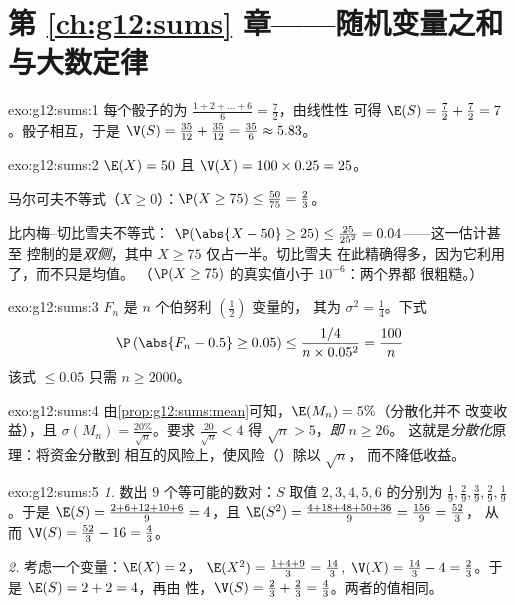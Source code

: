 \section*{第 \ref{ch:g12:sums} 章——随机变量之和与大数定律}

\begin{solution}{exo:g12:sums:1}
每个骰子的为
$\frac{1 + 2 + \dots + 6}{6} = \frac{7}{2}$，由线性性
可得 $\E(S) = \frac72 + \frac72 = 7$。骰子相互，于是
$\V(S) = \frac{35}{12} + \frac{35}{12} = \frac{35}{6} \approx 5.83$。
\end{solution}

\begin{solution}{exo:g12:sums:2}
$\E(X) = 50$ 且 $\V(X) = 100 \times 0.25 = 25$。

马尔可夫不等式（$X \geq 0$）：$\P(X \geq 75) \leq \frac{50}{75} = \frac23$。

比内梅--切比雪夫不等式：
$\P(\abs{X - 50} \geq 25) \leq \frac{25}{25^2} = 0.04$——这一估计甚至
控制的是\emph{双侧}，其中 $X \geq 75$ 仅占一半。切比雪夫
在此精确得多，因为它利用了，而不只是均值。
（$\P(X \geq 75)$ 的真实值小于 $10^{-6}$：两个界都
很粗糙。）
\end{solution}

\begin{solution}{exo:g12:sums:3}
$F_n$ 是 $n$ 个伯努利 $\left(\frac12\right)$ 变量的，
其为 $\sigma^2 = \frac14$。下式
\[
\P\left(\abs{F_n - 0.5} \geq 0.05\right)
\leq \frac{1/4}{n \times 0.05^2} = \frac{100}{n}
\]
该式 $\leq 0.05$ 只需 $n \geq 2000$。
\end{solution}

\begin{solution}{exo:g12:sums:4}
由\cref{prop:g12:sums:mean}可知，$\E(M_n) = 5\%$（分散化并不
改变收益），且
$\sigma(M_n) = \frac{20\%}{\sqrt n}$。要求
$\frac{20}{\sqrt n} < 4$ 得 $\sqrt n > 5$，\emph{即} $n \geq 26$。
这就是\emph{分散化}原理：将资金分散到
相互的风险上，使风险（）除以 $\sqrt n$，
而不降低收益。
\end{solution}

\begin{solution}{exo:g12:sums:5}
\emph{1.} 数出 $9$ 个等可能的数对：$S$ 取值
$2, 3, 4, 5, 6$ 的分别为
$\frac19, \frac29, \frac39, \frac29, \frac19$。于是
$\E(S) = \frac{2 + 6 + 12 + 10 + 6}{9} = 4$，且
$\E(S^2) = \frac{4 + 18 + 48 + 50 + 36}{9} = \frac{156}{9} = \frac{52}{3}$，
从而 $\V(S) = \frac{52}{3} - 16 = \frac43$。

\emph{2.} 考虑一个变量：$\E(X) = 2$，
$\E(X^2) = \frac{1 + 4 + 9}{3} = \frac{14}{3}$,
$\V(X) = \frac{14}{3} - 4 = \frac23$。于是 $\E(S) = 2 + 2 = 4$，再由
性，$\V(S) = \frac23 + \frac23 = \frac43$。两者的值相同。
\end{solution}

